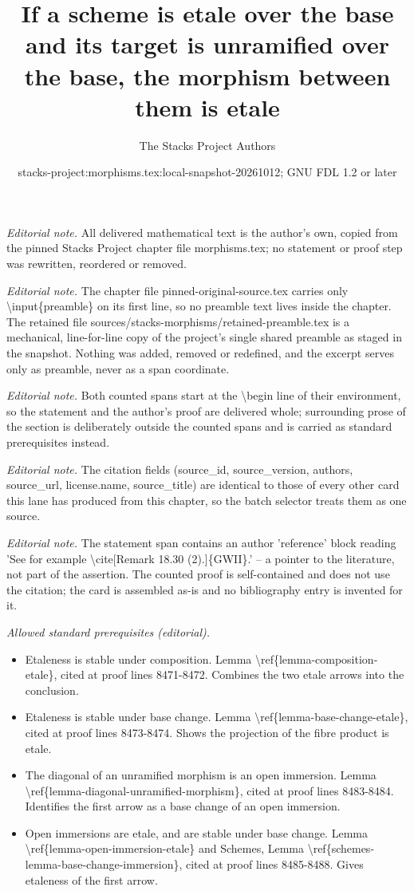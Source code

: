 \documentclass[10pt,a4paper]{amsart}
\title{If a scheme is etale over the base and its target is unramified over the base, the morphism between them is etale}
\author{The Stacks Project Authors}
\date{stacks-project:morphisms.tex:local-snapshot-20261012; GNU FDL 1.2 or later}
\theoremstyle{plain}
\theoremstyle{definition}
\theoremstyle{remark}
\numberwithin{equation}{subsection}
\begin{document}
\maketitle
\setcounter{subsection}{1}
\noindent\textit{Editorial note.} All delivered mathematical text is the author's own, copied from the pinned Stacks Project chapter file morphisms.tex; no statement or proof step was rewritten, reordered or removed.\par\medskip
\noindent\textit{Editorial note.} The chapter file pinned-original-source.tex carries only \textbackslash{}input\{preamble\} on its first line, so no preamble text lives inside the chapter. The retained file sources/stacks-morphisms/retained-preamble.tex is a mechanical, line-for-line copy of the project's single shared preamble as staged in the snapshot. Nothing was added, removed or redefined, and the excerpt serves only as preamble, never as a span coordinate.\par\medskip
\noindent\textit{Editorial note.} Both counted spans start at the \textbackslash{}begin line of their environment, so the statement and the author's proof are delivered whole; surrounding prose of the section is deliberately outside the counted spans and is carried as standard prerequisites instead.\par\medskip
\noindent\textit{Editorial note.} The citation fields (source\_id, source\_version, authors, source\_url, license.name, source\_title) are identical to those of every other card this lane has produced from this chapter, so the batch selector treats them as one source.\par\medskip
\noindent\textit{Editorial note.} The statement span contains an author 'reference' block reading 'See for example \textbackslash{}cite[Remark 18.30 (2).]\{GWII\}.' -- a pointer to the literature, not part of the assertion. The counted proof is self-contained and does not use the citation; the card is assembled as-is and no bibliography entry is invented for it.\par\medskip
\noindent\textit{Allowed standard prerequisites (editorial).}\begin{itemize}
\item Etaleness is stable under composition. Lemma \textbackslash{}ref\{lemma-composition-etale\}, cited at proof lines 8471-8472. Combines the two etale arrows into the conclusion.
\item Etaleness is stable under base change. Lemma \textbackslash{}ref\{lemma-base-change-etale\}, cited at proof lines 8473-8474. Shows the projection of the fibre product is etale.
\item The diagonal of an unramified morphism is an open immersion. Lemma \textbackslash{}ref\{lemma-diagonal-unramified-morphism\}, cited at proof lines 8483-8484. Identifies the first arrow as a base change of an open immersion.
\item Open immersions are etale, and are stable under base change. Lemma \textbackslash{}ref\{lemma-open-immersion-etale\} and Schemes, Lemma \textbackslash{}ref\{schemes-lemma-base-change-immersion\}, cited at proof lines 8485-8488. Gives etaleness of the first arrow.
\end{itemize}\medskip
\end{document}

